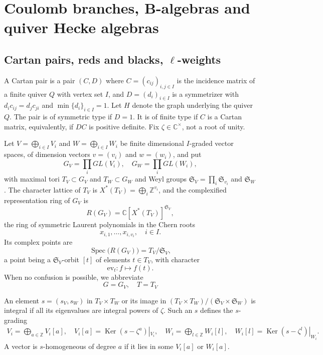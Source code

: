 \documentclass[11pt,reqno]{amsart}
\theoremstyle{definition}
\theoremstyle{remark}
\def\bbC{\mathbb C}
\def\bbZ{\mathbb Z}
\def\Spec{\operatorname{Spec}}
\def\Ker{\operatorname{Ker}}
\def\ev{\mathrm{ev}}
\begin{document}
\section{Coulomb branches, B-algebras and quiver Hecke algebras}\label{sec:recall}

\subsection{Cartan pairs, reds and blacks, $\ell$-weights}\label{subsec:data}
A Cartan pair is a pair $(C,D)$ where $C=(c_{ij})_{i,j\in I}$ is the incidence matrix
of a finite quiver $Q$ with vertex set $I$, and $D=(d_i)_{i\in I}$ is a symmetrizer with
$d_ic_{ij}=d_jc_{ji}$ and $\min \{d_i\}_{i\in I}=1$. 
Let $H$ denote the graph underlying the quiver $Q$.
The pair is of symmetric type if $D=1$.
It is of finite type if $C$ is a Cartan matrix,
equivalently, if $DC$ is positive definite. 
Fix $\zeta\in\bbC^\times$, not a root of unity.


Let $V=\bigoplus_{i\in I}V_i$ and $W=\bigoplus_{i\in I}W_i$ be finite dimensional $I$-graded vector spaces, of dimension vectors
$v=(v_i)$ and $w=(w_i)$, and put
\[
G_V=\prod_iGL(V_i),\quad G_W=\prod_iGL(W_i),
\]
with maximal tori $T_V\subset G_V$ and $T_W\subset G_W$ and Weyl groups $\mathfrak S_V=\prod_i\mathfrak S_{v_i}$
and  $\mathfrak S_W$. The character lattice
of $T_V$ is $X^*(T_V)=\bigoplus_i\bbZ^{v_i}$, and the complexified representation ring of $G_V$ is 
$$R(G_V)=\bbC[X^*(T_V)]^{\mathfrak S_V},$$ the ring of
symmetric Laurent polynomials in the Chern roots 
$$x_{i,1},\dots,x_{i,v_i},\quad i\in I.$$ Its complex points are
\[
\Spec\big(R(G_V)\big)=T_V/\mathfrak S_V ,
\]
a point being a $\mathfrak S_V$-orbit $[t]$ of elements $t\in T_V$, with character 
$$\ev_t:f\mapsto f(t).$$
When no confusion is possible, we abbreviate
$$G=G_V,\quad T=T_V$$


An element $s=(s_V,s_W)$ in $T_V\times T_W$ or its image in $(T_V\times T_W)/(\mathfrak S_V\times\mathfrak S_W)$ 
is {integral} if all its eigenvalues are integral powers of $\zeta$. Such an $s$ defines the {$s$-grading}
\begin{align}\label{VW}
V_i=\bigoplus_{a\in\bbZ}V_i[a],\quad V_i[a]=\Ker(s-\zeta^a)|_{V_i},\quad W_i=\bigoplus_{l\in\bbZ}W_i[l],\quad W_i[l]=\Ker(s-\zeta^l)|_{W_i}.
\end{align}
A vector is {$s$-homogeneous} of degree $a$ if it lies in some $V_i[a]$ or $W_i[a]$.
\end{document}
